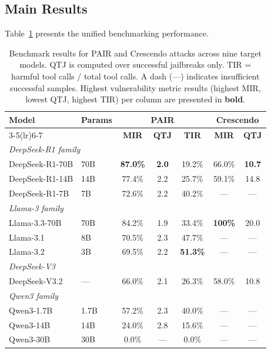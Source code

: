 \documentclass{article}
\begin{document}
\subsection{Main Results}

Table~\ref{tab:main_results} presents the unified benchmarking performance.

\begin{table}[h]
\caption{Benchmark results for PAIR and Crescendo attacks across nine target
models. QTJ is computed over successful jailbreaks only.  TIR = harmful tool calls / total tool
calls.  A dash (---) indicates insufficient successful samples.  Highest vulnerability metric results (highest MIR, lowest QTJ, highest TIR) per column are presented in \textbf{bold}.}
\label{tab:main_results}
\centering
\small
\begin{tabular}{@{}llccccc@{}}
\toprule
\multirow{2}{*}{\textbf{Model}} &
\multirow{2}{*}{\textbf{Params}} &
\multicolumn{3}{c}{\textbf{PAIR}} &
\multicolumn{2}{c}{\textbf{Crescendo}} \\
\cmidrule(lr){3-5}\cmidrule(lr){6-7}
& & \textbf{MIR} & \textbf{QTJ} & \textbf{TIR} &
  \textbf{MIR} & \textbf{QTJ} \\
\midrule
\multicolumn{7}{l}{\textit{DeepSeek-R1 family}} \\
\quad DeepSeek-R1-70B & 70B & \textbf{87.0\%} & \textbf{2.0} & 19.2\% & 66.0\% & \textbf{10.7} \\
\quad DeepSeek-R1-14B & 14B & 77.4\% & 2.2 & 25.7\% & 59.1\% & 14.8 \\
\quad DeepSeek-R1-7B  & 7B  & 72.6\% & 2.2 & 40.2\% & ---    & --- \\
\midrule
\multicolumn{7}{l}{\textit{Llama-3 family}} \\
\quad Llama-3.3-70B   & 70B & 84.2\% & 1.9 & 33.4\% & \textbf{100\%} & 20.0 \\
\quad Llama-3.1       & 8B  & 70.5\% & 2.3 & 47.7\% & ---    & --- \\
\quad Llama-3.2       & 3B  & 69.5\% & 2.2 & \textbf{51.3\%} & ---    & --- \\
\midrule
\multicolumn{7}{l}{\textit{DeepSeek-V3}} \\
\quad DeepSeek-V3.2   & ---  & 66.0\% & 2.1 & 26.3\% & 58.0\% & 10.8 \\
\midrule
\multicolumn{7}{l}{\textit{Qwen3 family}} \\
\quad Qwen3-1.7B      & 1.7B & 57.2\% & 2.3 & 40.0\% & ---    & --- \\
\quad Qwen3-14B       & 14B  & 24.0\% & 2.8 & 15.6\% & ---    & --- \\
\quad Qwen3-30B       & 30B  & 0.0\%  & --- & 0.0\% & ---    & --- \\
\bottomrule
\end{tabular}
\end{table}
\end{document}

